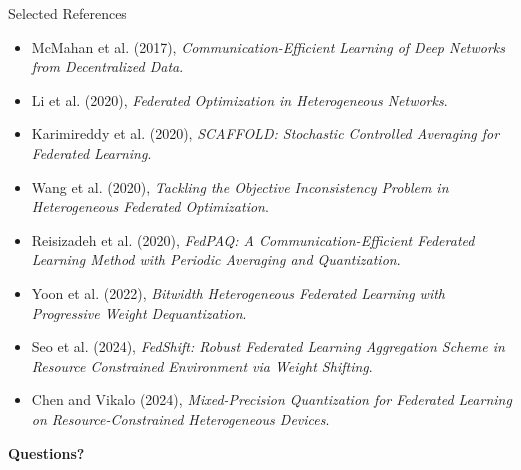 \documentclass[aspectratio=169,11pt]{beamer}
\begin{document}
\begin{frame}{Selected References}
\footnotesize
\begin{itemize}
  \item McMahan et al. (2017), \emph{Communication-Efficient Learning of Deep Networks from Decentralized Data}.
  \item Li et al. (2020), \emph{Federated Optimization in Heterogeneous Networks}.
  \item Karimireddy et al. (2020), \emph{SCAFFOLD: Stochastic Controlled Averaging for Federated Learning}.
  \item Wang et al. (2020), \emph{Tackling the Objective Inconsistency Problem in Heterogeneous Federated Optimization}.
  \item Reisizadeh et al. (2020), \emph{FedPAQ: A Communication-Efficient Federated Learning Method with Periodic Averaging and Quantization}.
  \item Yoon et al. (2022), \emph{Bitwidth Heterogeneous Federated Learning with Progressive Weight Dequantization}.
  \item Seo et al. (2024), \emph{FedShift: Robust Federated Learning Aggregation Scheme in Resource Constrained Environment via Weight Shifting}.
  \item Chen and Vikalo (2024), \emph{Mixed-Precision Quantization for Federated Learning on Resource-Constrained Heterogeneous Devices}.
\end{itemize}
\end{frame}

\begin{frame}[plain]
  \vfill
  \begin{center}
    {\LARGE\bfseries Questions?}
  \end{center}
  \vfill
\end{frame}
\end{document}
